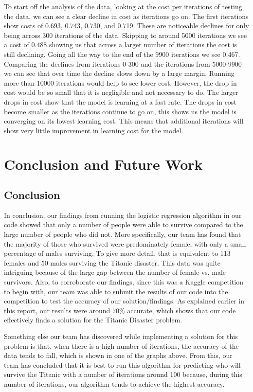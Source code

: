 \documentclass{IEEE}
\begin{document}
To start off the analysis of the data, looking at the cost per iterations of testing the data, we can see a clear decline in cost as iterations go on. The first iterations show costs of 0.693, 0.743, 0.730, and 0.719. These are noticeable declines for only being across 300 iterations of the data. Skipping to around 5000 iterations we see a cost of 0.488 showing us that across a larger number of iterations the cost is still declining. Going all the way to the end of the 9900 iterations we see 0.467. Comparing the declines from iterations 0-300 and the iterations from 5000-9900 we can see that over time the decline slows down by a large margin. Running more than 10000 iterations would help to see lower cost. However, the drop in cost would be so small that it is negligible and not necessary to do. The larger drops in cost show that the model is learning at a fast rate. The drops in cost become smaller as the iterations continue to go on, this shows us the model is converging on its lowest learning cost. This means that additional iterations will show very little improvement in learning cost for the model.

\section{Conclusion and Future Work}

\subsection{Conclusion}
In conclusion, our findings from running the logistic regression algorithm in our code showed that only a number of people were able to survive compared to the large number of people who did not. More specifically, our team has found that the majority of those who survived were predominately female, with only a small percentage of males surviving. To give more detail, that is equivalent to 113 females and 50 males surviving the Titanic disaster.  This data was quite intriguing because of the large gap between the number of female vs. male survivors. Also, to corroborate our findings, since this was a Kaggle competition to begin with, our team was able to submit the results of our code into the competition to test the accuracy of our solution/findings. As explained earlier in this report, our results were around 70\% accurate, which shows that our code effectively finds a solution for the Titanic Disaster problem.

Something else our team has discovered while implementing a solution for this problem is that, when there is a high number of iterations, the accuracy of the data tends to fall, which is shown in one of the graphs above. From this, our team has concluded that it is best to run this algorithm for predicting who will survive the Titanic with a number of iterations around 100 because, during this number of iterations, our algorithm tends to achieve the highest accuracy.
\end{document}
